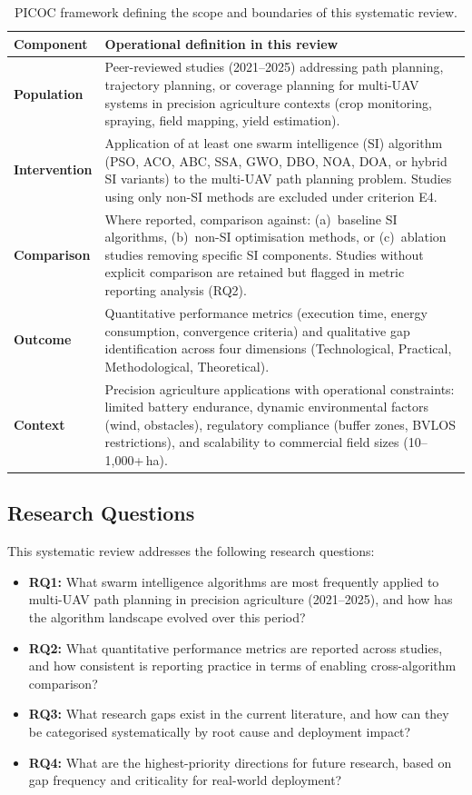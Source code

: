\documentclass[review,3p]{elsarticle}
\begin{document}
\begin{table}[htbp]
\centering
\caption{PICOC framework defining the scope and boundaries of this systematic review.}
\label{tab:picoc}
\begin{tabularx}{\textwidth}{lX}
\toprule
\textbf{Component} & \textbf{Operational definition in this review} \\
\midrule
\textbf{Population} & Peer-reviewed studies (2021--2025) addressing path planning,
trajectory planning, or coverage planning for multi-UAV systems in precision
agriculture contexts (crop monitoring, spraying, field mapping, yield estimation). \\
\textbf{Intervention} & Application of at least one swarm intelligence (SI) algorithm
(PSO, ACO, ABC, SSA, GWO, DBO, NOA, DOA, or hybrid SI variants) to the multi-UAV
path planning problem. Studies using only non-SI methods are excluded under
criterion E4. \\
\textbf{Comparison} & Where reported, comparison against: (a)~baseline SI algorithms,
(b)~non-SI optimisation methods, or (c)~ablation studies removing specific SI
components. Studies without explicit comparison are retained but flagged in metric
reporting analysis (RQ2). \\
\textbf{Outcome} & Quantitative performance metrics (execution time, energy
consumption, convergence criteria) and qualitative gap identification across four
dimensions (Technological, Practical, Methodological, Theoretical). \\
\textbf{Context} & Precision agriculture applications with operational constraints:
limited battery endurance, dynamic environmental factors (wind, obstacles), regulatory
compliance (buffer zones, BVLOS restrictions), and scalability to commercial field
sizes (10--1,000+\,ha). \\
\bottomrule
\end{tabularx}
\end{table}

\subsection{Research Questions}

This systematic review addresses the following research questions:

\begin{itemize}
  \item \textbf{RQ1:} What swarm intelligence algorithms are most frequently
  applied to multi-UAV path planning in precision agriculture (2021--2025), and
  how has the algorithm landscape evolved over this period?
  \item \textbf{RQ2:} What quantitative performance metrics are reported across
  studies, and how consistent is reporting practice in terms of enabling
  cross-algorithm comparison?
  \item \textbf{RQ3:} What research gaps exist in the current literature, and how
  can they be categorised systematically by root cause and deployment impact?
  \item \textbf{RQ4:} What are the highest-priority directions for future research,
  based on gap frequency and criticality for real-world deployment?
\end{itemize}
\end{document}
